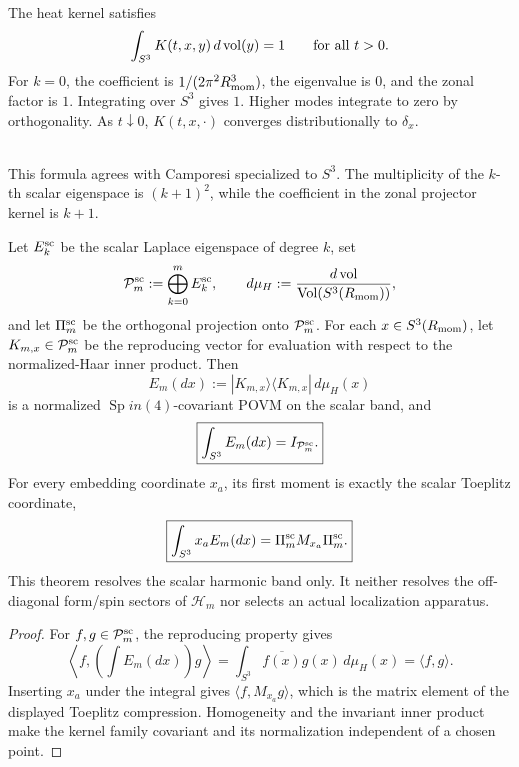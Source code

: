 \documentclass[11pt]{article}
\begin{document}
\begin{remark}
\mbox{}\\[6pt]
The heat kernel satisfies
\[
\int_{S^3}K(t,x,y)\,d\operatorname{vol}(y)=1
\qquad\text{for all }t>0.
\]
For \(k=0\), the coefficient is \(1/(2\pi^2R_{\mathrm{mom}}^3)\), the eigenvalue is \(0\), and the zonal factor is \(1\). Integrating over \(S^3\) gives \(1\). Higher modes integrate to zero by orthogonality. As \(t\downarrow0\), \(K(t,x,\cdot)\) converges distributionally to \(\delta_x\).
\end{remark}

\begin{remark}
\mbox{}\\[6pt]
This formula agrees with Camporesi \cite{Camporesi1991} specialized to \(S^3\). The multiplicity of the \(k\)-th scalar eigenspace is \((k+1)^2\), while the coefficient in the zonal projector kernel is \(k+1\).
\end{remark}

\begin{theorem}
\label{p1:thm:scalar-band-evaluation-povm}
\leavevmode\par
Let \(E_k^{\rm sc}\) be the scalar Laplace eigenspace of degree \(k\), set
\[
 \mathcal P_m^{\rm sc}:=\bigoplus_{k=0}^{m}E_k^{\rm sc},
 \qquad
 d\mu_H:=\frac{d\operatorname{vol}}
 {\operatorname{Vol}(S^3(R_{\mathrm{mom}}))},
\]
and let \(\Pi_m^{\rm sc}\) be the orthogonal projection onto
\(\mathcal P_m^{\rm sc}\).  For each \(x\in S^3(R_{\mathrm{mom}})\), let
\(K_{m,x}\in\mathcal P_m^{\rm sc}\) be the reproducing vector for evaluation
with respect to the normalized-Haar inner product.  Then
\[
 E_m(dx):=|K_{m,x}\rangle\langle K_{m,x}|\,d\mu_H(x)
\]
is a normalized \(\operatorname{Sp}in(4)\)-covariant POVM on the scalar band, and
\[
 \boxed{\int_{S^3}E_m(dx)=I_{\mathcal P_m^{\rm sc}}.}
\]
For every embedding coordinate \(x_a\), its first moment is exactly the
scalar Toeplitz coordinate,
\[
 \boxed{\int_{S^3}x_aE_m(dx)
 =\Pi_m^{\rm sc}M_{x_a}\Pi_m^{\rm sc}.}
\]
This theorem resolves the scalar harmonic band only.  It neither resolves
the off-diagonal form/spin sectors of \(\mathcal H_m\) nor selects an actual
localization apparatus.
\end{theorem}

\begin{proof}
For \(f,g\in\mathcal P_m^{\rm sc}\), the reproducing property gives
\[
 \left\langle f,\left(\int E_m(dx)\right)g\right\rangle
 =\int_{S^3}\overline{f(x)}g(x)\,d\mu_H(x)
 =\langle f,g\rangle.
\]
Inserting \(x_a\) under the integral gives
\(\langle f,M_{x_a}g\rangle\), which is the matrix element of the displayed
Toeplitz compression.  Homogeneity and the invariant inner product make the
kernel family covariant and its normalization independent of a chosen point.
\end{proof}
\end{document}
